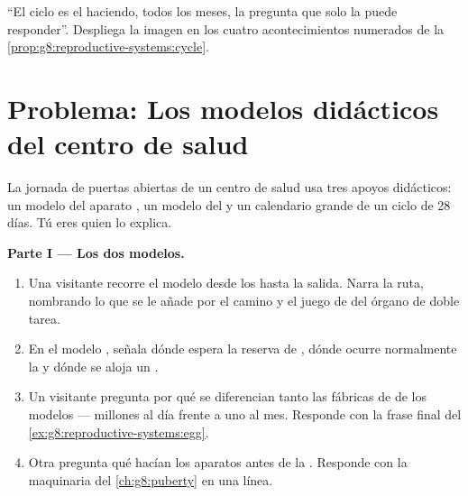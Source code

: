 \begin{exercise}[$\star\star\star$]\label{exo:g8:reproductive-systems:12}
``El ciclo es el  haciendo, todos los meses, la pregunta que solo
la  puede responder''. Despliega la imagen en los cuatro
acontecimientos numerados de la
\cref{prop:g8:reproductive-systems:cycle}.
\end{exercise}

\section{Problema: Los modelos didácticos del centro de salud}

\begin{problem}\label{pb:g8:reproductive-systems:1}
La jornada de puertas abiertas de un centro de salud usa tres apoyos
didácticos: un modelo del aparato , un modelo del  y
un calendario grande de un ciclo de 28 días. Tú eres quien lo explica.

\medskip\noindent\textbf{Parte I --- Los dos modelos.}
\begin{enumerate}
  \item Una visitante recorre el modelo  desde los 
        hasta la salida. Narra la ruta, nombrando lo que se le añade
        por el camino y el juego de  del órgano de doble tarea.
  \item En el modelo , señala dónde espera la reserva de
        , dónde ocurre normalmente la  y dónde se
        aloja un .
  \item Un visitante pregunta por qué se diferencian tanto las fábricas
        de  de los modelos --- millones al día frente a uno al
        mes. Responde con la frase final del
        \cref{ex:g8:reproductive-systems:egg}.
  \item Otra pregunta qué hacían los aparatos antes de la .
        Responde con la maquinaria del \cref{ch:g8:puberty} en una línea.
\end{enumerate}


\end{problem}
